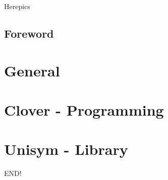 \documentclass[a4paper,12pt,UTF8]{book}
\begin{document}
\author{dosconio}
\begin{center}
	\sc\fontsize{48pt}{0}\selectfont\textcolor[rgb]{1, 0, 0.618}{Herepics}
\end{center}

\newpage %
\renewcommand{\contentsname}{Contents}
\tableofcontents

\section{Foreword} %

\chapter{General}

\chapter{Clover \mbox{-} Programming}



\chapter{Unisym \mbox{-} Library}


\newpage
END!%
\end{document}

